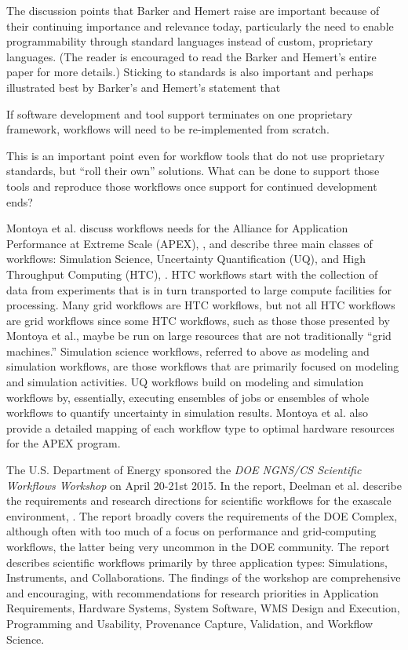 The discussion points that Barker and Hemert raise are important because
of their continuing importance and relevance today, particularly the
need to enable programmability through standard languages instead of
custom, proprietary languages. (The reader is encouraged to read the
Barker and Hemert's entire paper for more details.) Sticking to
standards is also important and perhaps illustrated best by Barker's and
Hemert's statement that

\begin{displayquote}
If software development and tool support terminates on one proprietary 
framework, workflows will need to be re-implemented from scratch.
\end{displayquote}

This is an important point even for workflow tools that do not use
proprietary standards, but ``roll their own'' solutions. What can be
done to support those tools and reproduce those workflows once support
for continued development ends?

Montoya et al. discuss workflows needs for the Alliance for Application
Performance at Extreme Scale (APEX), \cite{nersc_apex_2016}, and describe
three main classes of workflows: Simulation Science, Uncertainty
Quantification (UQ), and High Throughput Computing (HTC),
\cite{montoya_apex_2016}.
HTC workflows start with the collection of data from experiments that is in turn transported to large compute facilities for
processing. Many grid workflows are HTC workflows, but not all HTC
workflows are grid workflows since some HTC workflows, such as those
those presented by Montoya et al., maybe be run on large resources that
are not traditionally ``grid machines.'' Simulation science workflows,
referred to above as modeling and simulation workflows, are those
workflows that are primarily focused on modeling and simulation
activities. UQ workflows build on modeling and simulation workflows by,
essentially, executing ensembles of jobs or ensembles of whole workflows
to quantify uncertainty in simulation results. Montoya et al. also
provide a detailed mapping of each workflow type to optimal hardware
resources for the APEX program.

The U.S. Department of Energy sponsored the \emph{DOE NGNS/CS Scientific
Workflows Workshop} on April 20-21st 2015. In the report, Deelman et al.
describe the requirements and research directions for scientific
workflows for the exascale environment, \cite{deelman_future_2015}. The report
broadly covers the requirements of the DOE Complex, although often with
too much of a focus on performance and grid-computing workflows, the
latter being very uncommon in the DOE community. The report describes
scientific workflows primarily by three application types: Simulations,
Instruments, and Collaborations. The findings of the workshop are
comprehensive and encouraging, with recommendations for research
priorities in Application Requirements, Hardware Systems, System
Software, WMS Design and Execution, Programming and Usability,
Provenance Capture, Validation, and Workflow Science.

